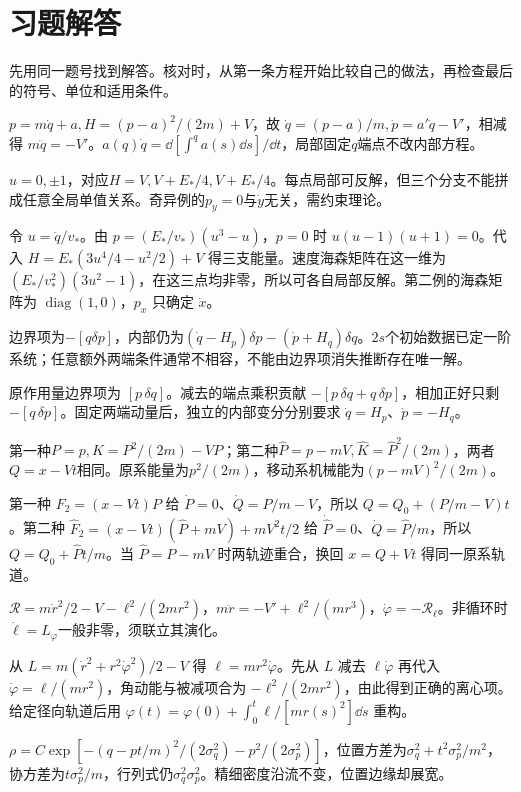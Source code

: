 \section*{习题解答}
先用同一题号找到解答。核对时，从第一条方程开始比较自己的做法，再检查最后的符号、单位和适用条件。
\begin{bookexercises}
\item $p=m\dot q+a,H=(p-a)^2/(2m)+V$，故 $\dot q=(p-a)/m,\dot p=a'\dot q-V'$，相减得 $m\ddot q=-V'$。$a(q)\dot q=\dd[\int^qa(s)\dd s]/\dd t$，局部固定$q$端点不改内部方程。
\item $u=0,\pm1$，对应$H=V,V+E_*/4,V+E_*/4$。每点局部可反解，但三个分支不能拼成任意全局单值关系。奇异例的$p_y=0$与$\dot y$无关，需约束理论。

令 $u=\dot q/v_*$。由 $p=(E_*/v_*)(u^3-u)$，$p=0$ 时 $u(u-1)(u+1)=0$。代入 $H=E_*(3u^4/4-u^2/2)+V$ 得三支能量。速度海森矩阵在这一维为 $(E_*/v_*^2)(3u^2-1)$，在这三点均非零，所以可各自局部反解。第二例的海森矩阵为 $\operatorname{diag}(1,0)$，$p_x$ 只确定 $\dot x$。
\item 边界项为$-[q\delta p]$，内部仍为$(\dot q-H_p)\delta p-(\dot p+H_q)\delta q$。$2s$个初始数据已定一阶系统；任意额外两端条件通常不相容，不能由边界项消失推断存在唯一解。

原作用量边界项为 $[p\,\delta q]$。减去的端点乘积贡献 $-[p\,\delta q+q\,\delta p]$，相加正好只剩 $-[q\,\delta p]$。固定两端动量后，独立的内部变分分别要求 $\dot q=H_p$、$\dot p=-H_q$。
\item 第一种$P=p,K=P^2/(2m)-VP$；第二种$\widehat P=p-mV,\widehat K=\widehat P^2/(2m)$，两者$Q=x-Vt$相同。原系能量为$p^2/(2m)$，移动系机械能为$(p-mV)^2/(2m)$。

第一种 $F_2=(x-Vt)P$ 给 $\dot P=0$、$\dot Q=P/m-V$，所以 $Q=Q_0+(P/m-V)t$。第二种 $\widehat F_2=(x-Vt)(\widehat P+mV)+mV^2t/2$ 给 $\dot{\widehat P}=0$、$\dot Q=\widehat P/m$，所以 $Q=Q_0+\widehat P t/m$。当 $\widehat P=P-mV$ 时两轨迹重合，换回 $x=Q+Vt$ 得同一原系轨道。
\item $\mathcal R=m\dot r^2/2-V-\ell^2/(2mr^2)$，$m\ddot r=-V'+\ell^2/(mr^3)$，$\dot\varphi=-\mathcal R_\ell$。非循环时$\dot\ell=L_\varphi$一般非零，须联立其演化。

从 $L=m(\dot r^2+r^2\dot\varphi^2)/2-V$ 得 $\ell=mr^2\dot\varphi$。先从 $L$ 减去 $\ell\dot\varphi$ 再代入 $\dot\varphi=\ell/(mr^2)$，角动能与被减项合为 $-\ell^2/(2mr^2)$，由此得到正确的离心项。给定径向轨道后用 $\varphi(t)=\varphi(0)+\int_0^t\ell/[mr(s)^2]\dd s$ 重构。
\item $\rho=C\exp[-(q-pt/m)^2/(2\sigma_q^2)-p^2/(2\sigma_p^2)]$，位置方差为$\sigma_q^2+t^2\sigma_p^2/m^2$，协方差为$t\sigma_p^2/m$，行列式仍$\sigma_q^2\sigma_p^2$。精细密度沿流不变，位置边缘却展宽。


\end{bookexercises}
